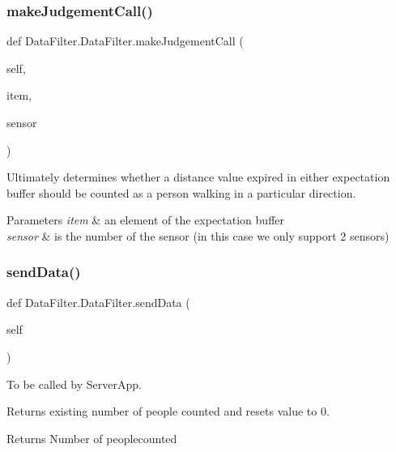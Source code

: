 \subsubsection{\texorpdfstring{make\+Judgement\+Call()}{makeJudgementCall()}}
{\footnotesize\ttfamily def Data\+Filter.\+Data\+Filter.\+make\+Judgement\+Call (\begin{DoxyParamCaption}\item[{}]{self,  }\item[{}]{item,  }\item[{}]{sensor }\end{DoxyParamCaption})}



Ultimately determines whether a distance value expired in either expectation buffer should be counted as a person walking in a particular direction. 


\begin{DoxyParams}{Parameters}
{\em item} & an element of the expectation buffer \\
\hline
{\em sensor} & is the number of the sensor (in this case we only support 2 sensors) \\
\hline
\end{DoxyParams}
\mbox{\label{class_data_filter_1_1_data_filter_a8ce1d7743127e462a018d678d5e44927}} 
\subsubsection{\texorpdfstring{send\+Data()}{sendData()}}
{\footnotesize\ttfamily def Data\+Filter.\+Data\+Filter.\+send\+Data (\begin{DoxyParamCaption}\item[{}]{self }\end{DoxyParamCaption})}



To be called by Server\+App. 

Returns existing number of people counted and resets value to 0. \begin{DoxyReturn}{Returns}
Number of peoplecounted 
\end{DoxyReturn}
\mbox{\label{class_data_filter_1_1_data_filter_a494edf5de2ab50286063711a120d05ef}} 
